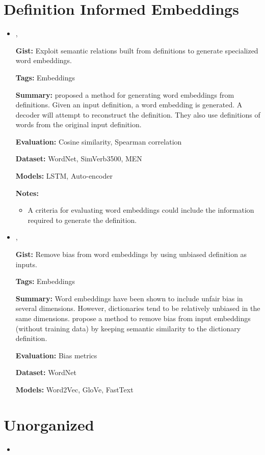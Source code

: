 \documentclass{article}[a4paper]
\newcommand{\bitem}[2]{
    \item[\cite{#1}]
        \textbf{\citetitle{#1}}

        \citeauthor{#1}, \citeyear{#1}
        \newline\newline
        {#2}
}%
\begin{document}
\section{Definition Informed Embeddings}
\begin{itemize}
    \bitem{bosc_auto_2018}%
    {%
        \textbf{Gist:}
        Exploit semantic relations built from definitions to generate specialized
        word embeddings.

        \textbf{Tags:}
        Embeddings

        \textbf{Summary:}
        \citeauthor{bosc_auto_2018} proposed a method for generating word
        embeddings from definitions. Given an input definition, a word embedding
        is generated. A decoder will attempt to reconstruct the definition. They
        also use definitions of words from the original input definition.

        \textbf{Evaluation:}
        Cosine similarity, Spearman correlation

        \textbf{Dataset:}
        WordNet, SimVerb3500, MEN

        \textbf{Models:}
        LSTM, Auto-encoder

        \textbf{Notes:}
        \begin{itemize}
            \item A criteria for evaluating word embeddings could include the
                  information required to generate the definition.
        \end{itemize}
    }%

    \bitem{kaneko_dictionary_2021}%
    {%
        \textbf{Gist:}
        Remove bias from word embeddings by using unbiased definition as inputs.

        \textbf{Tags:}
        Embeddings

        \textbf{Summary:}
        Word embeddings have been shown to include unfair bias in several
        dimensions. However, dictionaries tend to be relatively unbiased in the
        same dimensions. \citeauthor{kaneko_dictionary_2021} propose a method
        to remove bias from input embeddings (without training data) by keeping
        semantic similarity to the dictionary definition.

        \textbf{Evaluation:}
        Bias metrics

        \textbf{Dataset:}
        WordNet

        \textbf{Models:}
        Word2Vec, GloVe, FastText
    }%
\end{itemize}

\section{Unorganized}
\begin{itemize}
    \item {}

\end{itemize}

\printbibliography
\end{document}
